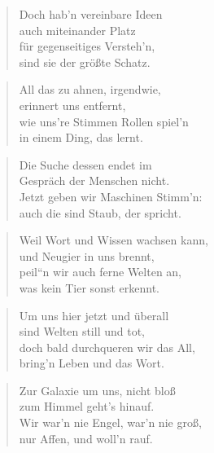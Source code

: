 \documentclass[10pt,a4paper]{article}
\begin{document}
\begin{paracol}{2}
\begin{verse}
Doch hab’n vereinbare Ideen \\
auch miteinander Platz \\
für gegenseitiges Versteh’n, \\
sind sie der größte Schatz. \\
\end{verse}

\begin{verse}
All das zu ahnen, irgendwie, \\
erinnert uns entfernt, \\
wie uns’re Stimmen Rollen spiel’n \\
in einem Ding, das lernt. \\
\end{verse}

\begin{verse}
Die Suche dessen endet im \\
Gespräch der Menschen nicht. \\
Jetzt geben wir Maschinen Stimm’n: \\
auch die sind Staub, der spricht. \\
\end{verse}

\begin{verse}
Weil Wort und Wissen wachsen kann, \\
und Neugier in uns brennt, \\
peil“n wir auch ferne Welten an, \\
was kein Tier sonst erkennt. \\
\end{verse}

\begin{verse}
Um uns hier jetzt und überall \\
sind Welten still und tot, \\
doch bald durchqueren wir das All, \\
bring’n Leben und das Wort. \\
\end{verse}

\begin{verse}
Zur Galaxie um uns, nicht bloß \\
zum Himmel geht’s hinauf. \\
Wir war’n nie Engel, war’n nie groß, \\
nur Affen, und woll’n rauf. \\
\end{verse}


\end{paracol}
\end{document}
